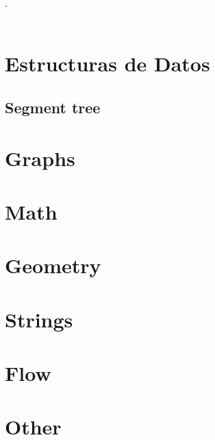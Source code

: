 

\def\title{Competitive Programing Reference}
.\\[0.2cm]
 \\[0.5cm]
\tableofcontents\newpage

\section{Estructuras de Datos}
\subsection{Segment tree}

\section{Graphs}

\section{Math}

\section{Geometry}


\section{Strings}


\section{Flow}


\section{Other}




